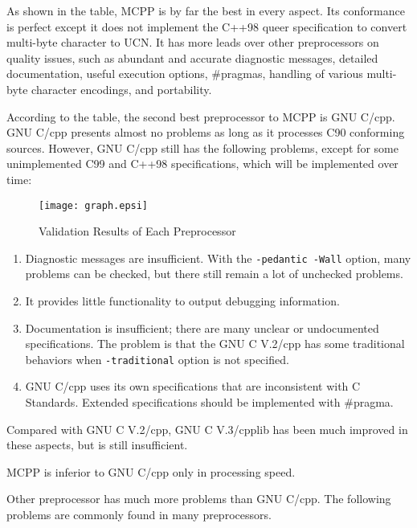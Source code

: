 \documentclass[twocolumn]{article}
\begin{document}
As shown in the table, MCPP is by far the best in every aspect. 
Its conformance is perfect except
\newpage
\vspace*{10pt}
\noindent
it does not implement the C++98 queer specification to convert multi-byte character to UCN. 
It has more leads over other preprocessors on quality issues, such as abundant and accurate diagnostic messages, detailed documentation, useful execution options, \#pragmas, handling of various multi-byte character encodings, and portability.

\vspace*{8pt}

According to the table, the second best preprocessor to MCPP is GNU C/cpp.  GNU C/cpp presents almost no problems as long as it processes C90 conforming sources.  However, GNU C/cpp still has the following problems, except for some unimplemented C99 and C++98 specifications, which will be implemented over time:

\begin{figure*}
\begin{center}
\vspace*{5pt}
\texttt{[image: graph.epsi]}
\end{center}
\caption{Validation Results of Each Preprocessor}
\label{graph}
\end{figure*}%

\begin{enumerate}
\item Diagnostic messages are insufficient.  With the \verb|-pedantic -Wall| option, many problems can be checked, but there still remain a lot of unchecked problems.
\item It provides little functionality to output debugging information.
\item Documentation is insufficient; there are many unclear or undocumented specifications.  The problem is that the GNU C V.2/cpp has some traditional behaviors when \verb|-traditional| option is not specified.
\item GNU C/cpp uses its own specifications that are inconsistent with C Standards.  Extended specifications should be implemented with \#pragma.
\end{enumerate}

Compared with GNU C V.2/cpp, GNU C V.3/cpplib has been much improved in these aspects, but is still insufficient.

MCPP is inferior to GNU C/cpp only in processing speed.

Other preprocessor has much more problems than GNU C/cpp. 
The following problems are commonly found in many preprocessors.
\end{document}
